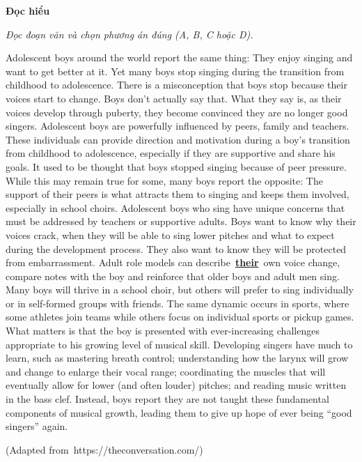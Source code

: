 \documentclass[12pt,a4paper,twoside]{article}
\newenvironment{readingpassage}[1][]{%
    \begin{tcolorbox}[enhanced, colback=grayLight, colframe=secondaryBlue,
        coltitle=textDark, fonttitle=\bfseries, title={#1},
        rounded corners, arc=3mm, boxrule=1pt,
        left=15pt, right=15pt, top=10pt, bottom=10pt,
        breakable, before skip=10pt, after skip=10pt, drop fuzzy shadow]
    \setstretch{1.3}
}{\end{tcolorbox}}
\begin{document}
\begin{groupbox}\textbf{\large Đọc hiểu}\end{groupbox}
\textit{Đọc đoạn văn và chọn phương án đúng (A, B, C hoặc D).}
\begin{readingpassage}[]
Adolescent boys around the world report the same thing: They enjoy singing and want to get better at it. Yet many boys stop singing during the transition from childhood to adolescence. There is a misconception that boys stop because their voices start to change. Boys don’t actually say that. What they say is, as their voices develop through puberty, they become convinced they are no longer good singers. Adolescent boys are powerfully influenced by peers, family and teachers. These individuals can provide direction and motivation during a boy’s transition from childhood to adolescence, especially if they are supportive and share his goals. It used to be thought that boys stopped singing because of peer pressure. While this may remain true for some, many boys report the opposite: The support of their peers is what attracts them to singing and keeps them involved, especially in school choirs. Adolescent boys who sing have unique concerns that must be addressed by teachers or supportive adults. Boys want to know why their voices crack, when they will be able to sing lower pitches and what to expect during the development process. They also want to know they will be protected from embarrassment. Adult role models can describe \underline{\textbf{their}} own voice change, compare notes with the boy and reinforce that older boys and adult men sing. Many boys will thrive in a school choir, but others will prefer to sing individually or in self-formed groups with friends. The same dynamic occurs in sports, where some athletes join teams while others focus on individual sports or pickup games. What matters is that the boy is presented with ever-increasing challenges appropriate to his growing level of musical skill. Developing singers have much to learn, such as mastering breath control; understanding how the larynx will grow and change to enlarge their vocal range; coordinating the muscles that will eventually allow for lower (and often louder) pitches; and reading music written in the bass clef. Instead, boys report they are not taught these fundamental components of musical growth, leading them to give up hope of ever being “good singers” again.

(Adapted from https://theconversation.com/)
\end{readingpassage}
\end{document}

